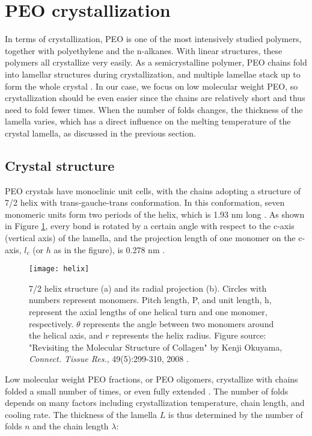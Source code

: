 \section{PEO crystallization}

In terms of crystallization, PEO is one of the most intensively studied polymers, together with polyethylene and the n-alkanes. With linear structures, these polymers all crystallize very easily. As a semicrystalline polymer, PEO chains fold into lamellar structures during crystallization, and multiple lamellae stack up to form the whole crystal \cite{Arlif1966}. In our case, we focus on low molecular weight PEO, so crystallization should be even easier since the chains are relatively short and thus need to fold fewer times. When the number of folds changes, the thickness of the lamella varies, which has a direct influence on the melting temperature of the crystal lamella, as discussed in the previous section.

\subsection{Crystal structure} \label{crystalstructure}

PEO crystals have monoclinic unit cells, with the chains adopting a structure of 7/2 helix with trans-gauche-trans conformation. In this conformation, seven monomeric units form two periods of the helix, which is 1.93 nm long \cite{Yoshihara1964}. As shown in Figure \ref{fig:PEOhelix}, every bond is rotated by a certain angle with respect to the c-axis (vertical axis) of the lamella, and the projection length of one monomer on the c-axis, $l_{c}$ (or $h$ as in the figure), is 0.278 nm \cite{Takahashi1973}.

\begin{figure}[H]
\center
\texttt{[image: helix]}
\caption[7/2 helix structure (a) and its radial projection (b).]{7/2 helix structure (a) and its radial projection (b). Circles with numbers represent monomers. Pitch length, P, and unit length, h, represent the axial lengths of one helical turn and one monomer, respectively. $\theta$ represents the angle between two monomers around the helical axis, and $r$ represents the helix radius. Figure source: "Revisiting the Molecular Structure of Collagen" by Kenji Okuyama, \textit{Connect. Tissue Res.}, 49(5):299-310, 2008 \cite{Okuyama2008}.}
\label{fig:PEOhelix}
\end{figure}

Low molecular weight PEO fractions, or PEO oligomers, crystallize with chains folded a small number of times, or even fully extended \cite{Kovacs1975,Kovacs1977}. The number of folds depends on many factors including crystallization temperature, chain length, and cooling rate. The thickness of the lamella $L$ is thus determined by the number of folds $n$ and the chain length $\lambda$:


